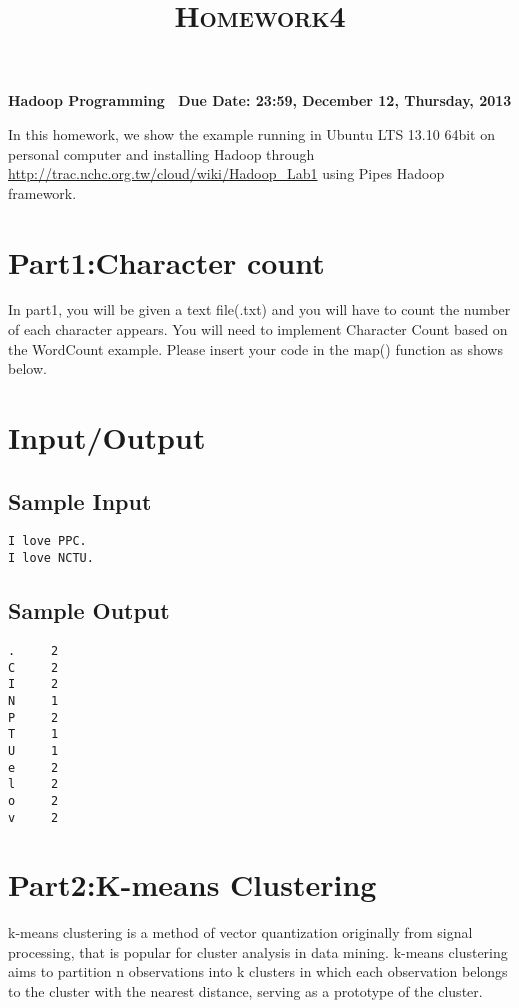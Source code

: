 \documentclass[a4paper,10pt]{article}
\newcommand\mytitle{Homework4}
\begin{document}
\title{\Huge \textsc{\mytitle}}
\date{}
\maketitle


\begin{center}
\LARGE \bf {Hadoop Programming}~\newline
\bf {Due Date: 23:59, December 12, Thursday, 2013}
\end{center}
In this homework, we show the example running in Ubuntu LTS 13.10 64bit on personal computer and
installing Hadoop through \url{http://trac.nchc.org.tw/cloud/wiki/Hadoop_Lab1} using Pipes Hadoop framework.


\section{Part1:Character count}
In part1, you will be given a text file(.txt) and you will have to count the number of each character appears.
You will need to implement Character Count based on the WordCount example. Please insert your code
in the map() function as shows below.

\lstset{
  language=C++,
  frame=single,
  showspaces=false,
  showstringspaces=false,
  basicstyle=\ttfamily
}



\section{Input/Output}

\subsection{Sample Input}
\begin{verbatim}
I love PPC.
I love NCTU.
\end{verbatim}

\subsection{Sample Output}
\begin{verbatim}
.	  2
C	  2
I	  2
N	  1
P	  2
T	  1
U	  1
e	  2
l	  2
o	  2
v	  2
\end{verbatim}

\section{Part2:K-means Clustering}
k-means clustering is a method of vector quantization originally from signal processing, that is popular for cluster analysis in data mining. k-means clustering aims to partition n observations into k clusters in which each observation belongs to the cluster with the nearest distance, serving as a prototype of the cluster.
\end{document}
